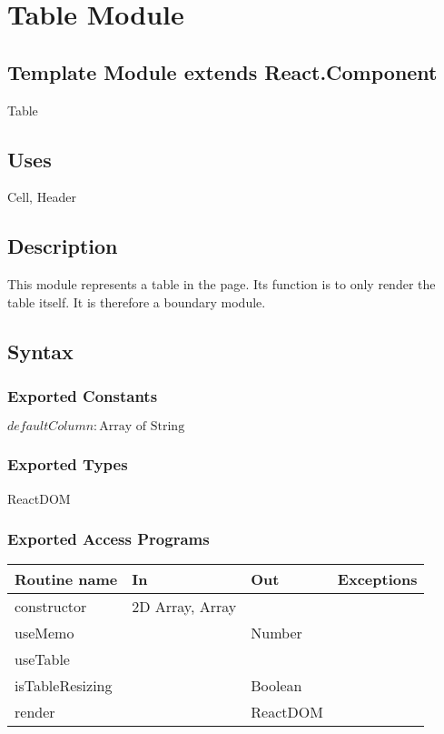 \documentclass[12pt, titlepage]{article}
\begin{document}
\newpage

\section{Table Module}

\subsection{Template Module extends React.Component}

Table

\subsection{Uses}

Cell, Header

\subsection{Description}
This module represents a table in the page. Its function is to only render the table itself. It is therefore a boundary module.

\subsection{Syntax}

\subsubsection{Exported Constants}

$\mathit{defaultColumn}: \text{Array of String}$

\subsubsection{Exported Types}

ReactDOM

\subsubsection{Exported Access Programs}

\begin{tabular}{| l | l | l | l |}
  \hline
  \textbf{Routine name} & \textbf{In} & \textbf{Out} & \textbf{Exceptions}\\
  \hline
  constructor & 2D Array, Array & ~ & ~\\
  \hline
  useMemo & ~ & Number & ~\\
  \hline
  useTable & ~ & ~ & ~\\
  \hline
  isTableResizing & ~ & Boolean & ~\\
  \hline
  render & ~ & ReactDOM & ~\\
  \hline
\end{tabular}
\end{document}
